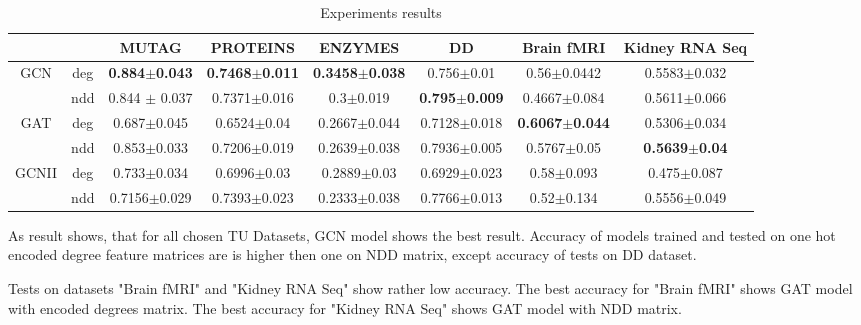 \begin{table}[]
    \scriptsize
    \begin{tabular}{|c|c|c|c|c|c|c|c|}
        \hline
                               &     & MUTAG                 & PROTEINS               & ENZYMES                & DD                    & Brain fMRI             & Kidney RNA Seq        \\ \hline
        \multirow{2}{*}{GCN}   & deg & \textbf{0.884$\pm$0.043} & \textbf{0.7468$\pm$0.011} & \textbf{0.3458$\pm$0.038} & 0.756$\pm$0.01           & 0.56$\pm$0.0442           & 0.5583$\pm$0.032         \\
                               & ndd & 0.844 $\pm$ 0.037         & 0.7371$\pm$0.016          & 0.3$\pm$0.019             & \textbf{0.795$\pm$0.009} & 0.4667$\pm$0.084          & 0.5611$\pm$0.066         \\ \cline{1-8}
        \multirow{2}{*}{GAT}   & deg & 0.687$\pm$0.045          & 0.6524$\pm$0.04           & 0.2667$\pm$0.044          & 0.7128$\pm$0.018         & \textbf{0.6067$\pm$0.044} & 0.5306$\pm$0.034         \\
                               & ndd & 0.853$\pm$0.033          & 0.7206$\pm$0.019          & 0.2639$\pm$0.038          & 0.7936$\pm$0.005         & 0.5767$\pm$0.05           & \textbf{0.5639$\pm$0.04} \\ \cline{1-8}
        \multirow{2}{*}{GCNII} & deg & 0.733$\pm$0.034          & 0.6996$\pm$0.03           & 0.2889$\pm$0.03           & 0.6929$\pm$0.023         & 0.58$\pm$0.093            & 0.475$\pm$0.087          \\
                               & ndd & 0.7156$\pm$0.029         & 0.7393$\pm$0.023          & 0.2333$\pm$0.038          & 0.7766$\pm$0.013         & 0.52$\pm$0.134            & 0.5556$\pm$0.049         \\ \hline
    \end{tabular}
    \caption{Experiments results}
    \label{tab:results}
\end{table}

As result shows, that for all chosen TU Datasets, GCN model shows the best result. Accuracy of models trained and tested on one hot encoded degree feature matrices
are is higher then one on NDD matrix, except accuracy of tests on DD dataset.

Tests on datasets "Brain fMRI" and "Kidney RNA Seq" show rather low accuracy. The best accuracy for "Brain fMRI" shows GAT model with encoded degrees matrix. 
The best accuracy for "Kidney RNA Seq" shows GAT model with NDD matrix. 

